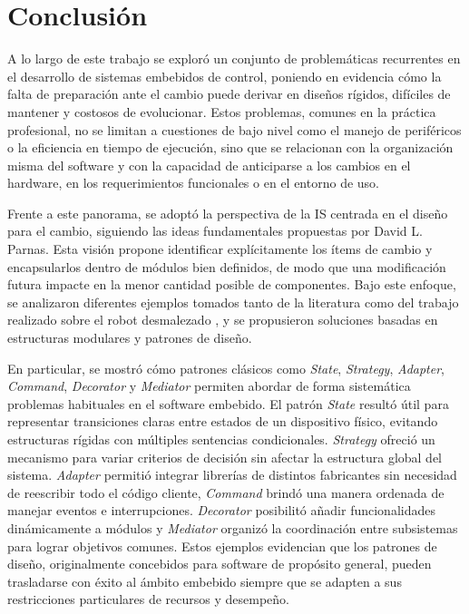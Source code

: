 \chapter{Conclusión}
\label{conclusion}

A lo largo de este trabajo se exploró un conjunto de problemáticas recurrentes en el desarrollo de sistemas embebidos de control, poniendo en evidencia cómo la falta de preparación ante el cambio puede derivar en diseños rígidos, difíciles de mantener y costosos de evolucionar. Estos problemas, comunes en la práctica profesional, no se limitan a cuestiones de bajo nivel como el manejo de periféricos o la eficiencia en tiempo de ejecución, sino que se relacionan con la organización misma del software y con la capacidad de anticiparse a los cambios en el hardware, en los requerimientos funcionales o en el entorno de uso.

Frente a este panorama, se adoptó la perspectiva de la \gls{IS} centrada en el diseño para el cambio, siguiendo las ideas fundamentales propuestas por David L. Parnas. Esta visión propone identificar explícitamente los ítems de cambio y encapsularlos dentro de módulos bien definidos, de modo que una modificación futura impacte en la menor cantidad posible de componentes. Bajo este enfoque, se analizaron diferentes ejemplos tomados tanto de la literatura \citep{douglass} como del trabajo realizado sobre el robot desmalezado \cite{paperPomponio}, y se propusieron soluciones basadas en estructuras modulares y patrones de diseño.

En particular, se mostró cómo patrones clásicos como \textit{State}, \textit{Strategy}, \textit{Adapter}, \textit{Command}, \textit{Decorator} y \textit{Mediator} permiten abordar de forma sistemática problemas habituales en el software embebido. El patrón \textit{State} resultó útil para representar transiciones claras entre estados de un dispositivo físico, evitando estructuras rígidas con múltiples sentencias condicionales. \textit{Strategy} ofreció un mecanismo para variar criterios de decisión sin afectar la estructura global del sistema. \textit{Adapter} permitió integrar librerías de distintos fabricantes sin necesidad de reescribir todo el código cliente, \textit{Command} brindó una manera ordenada de manejar eventos e interrupciones. \textit{Decorator} posibilitó añadir funcionalidades dinámicamente a módulos y \textit{Mediator} organizó la coordinación entre subsistemas para lograr objetivos comunes. Estos ejemplos evidencian que los patrones de diseño, originalmente concebidos para software de propósito general, pueden trasladarse con éxito al ámbito embebido siempre que se adapten a sus restricciones particulares de recursos y desempeño.

